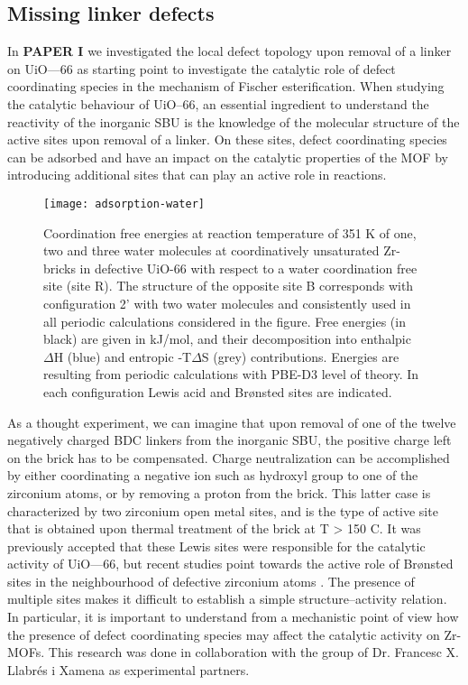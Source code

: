 \subsection{Missing linker defects}
In \textbf{PAPER I} we investigated the local defect topology upon removal of a linker on UiO—66 as starting point to investigate the catalytic role of defect coordinating species in the mechanism of Fischer esterification. When studying the catalytic behaviour of UiO--66, an essential ingredient to understand the reactivity of the inorganic SBU is the knowledge of the molecular structure of the active sites upon removal of a linker. On these sites, defect coordinating species can be adsorbed and have an impact on the catalytic properties of the MOF by introducing additional sites that can play an active role in reactions. 
\begin{figure}[!htp]
	\centering
	\texttt{[image: adsorption-water]}
	\caption{Coordination free energies at reaction temperature of 351 K of one, two and three water molecules at coordinatively unsaturated Zr-bricks in defective UiO-66 with respect to a water coordination free site (site R). The structure of the opposite site B corresponds with configuration 2’ with two water molecules and consistently used in all periodic calculations considered in the figure. Free energies (in black) are given in kJ/mol, and their decomposition into enthalpic $\Delta$H (blue) and entropic -T$\Delta$S (grey) contributions. Energies are resulting from periodic calculations with PBE-D3 level of theory. In each configuration Lewis acid and Brønsted sites are indicated.}
	\label{fig:adsorption-water}
\end{figure}
As a thought experiment, we can imagine that upon removal of one of the twelve negatively charged BDC linkers from the inorganic  SBU, the positive charge left on the brick has to be compensated. Charge neutralization can be accomplished by either coordinating a negative ion such as hydroxyl group to one of the zirconium atoms, or by removing a proton from the brick. This latter case is characterized by two zirconium open metal sites, and is the type of active site that is obtained upon thermal treatment of the brick at T > 150 C.  It was previously accepted that these Lewis sites were responsible for the catalytic activity of UiO—66, but recent studies point towards the active role of Br\o{}nsted sites in the neighbourhood of defective zirconium atoms \cite{canivet2014water, oien2014detailed, canivet2016origin, ling2016dynamic, liu2016probing, klet2016evaluation, vandichel2016water, ghosh2014water}. The presence of multiple sites makes it difficult to establish a simple structure--activity relation. In particular, it is important to understand from a mechanistic point of view how the presence of defect coordinating species may affect the catalytic activity on Zr-MOFs. This research was done in collaboration with the group of Dr. Francesc X. Llabr\'es i Xamena as experimental partners. 
